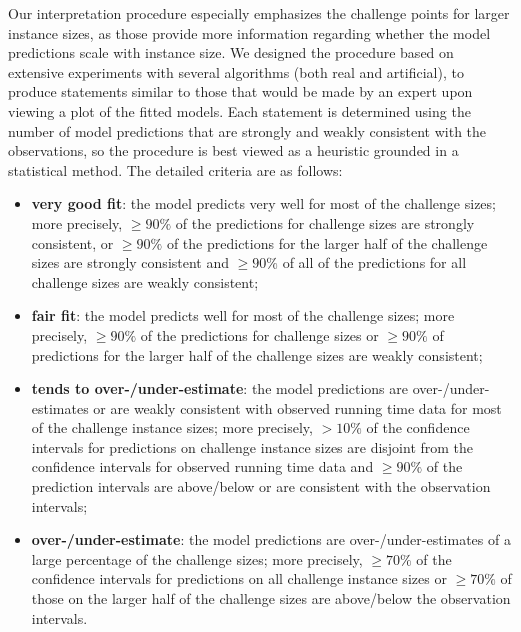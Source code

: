 \documentclass[aic]{iosart2x}
\begin{document}
Our interpretation procedure especially emphasizes the challenge points for larger instance sizes, as those provide more information regarding whether the model predictions scale with instance size. We designed the procedure based on extensive experiments with several algorithms (both real and artificial), to produce statements similar to those that would be made by an expert upon viewing a plot of the fitted models. Each statement is determined using the number of model predictions that are strongly and weakly consistent with the observations, so the procedure is best viewed as a heuristic grounded in a statistical method. The detailed criteria are as follows:
\begin{itemize}
\item \textbf{very good fit}: the model predicts very well for most of the challenge sizes; more precisely, $\geq 90\%$ of the predictions for challenge sizes are strongly consistent, or $\geq 90\%$ of the predictions for the larger half of the challenge sizes are strongly consistent and $ \geq 90\%$ of all of the predictions for all challenge sizes are weakly consistent;

\item \textbf{fair fit}: the model predicts well for most of the challenge sizes; more precisely, $\geq 90\%$ of the predictions for challenge sizes or $\geq 90\%$ of predictions for the larger half of the challenge sizes are weakly consistent;

\item \textbf{tends to over-/under-estimate}: the model predictions are over-/under-estimates or are weakly consistent with observed running time data for most of the challenge instance sizes; more precisely, $> 10\%$ of the confidence intervals for predictions on challenge instance sizes are disjoint from the confidence intervals for observed running time data and $\geq 90\%$ of the prediction intervals are above/below or are consistent with the observation intervals;

\item \textbf{over-/under-estimate}: the model predictions are over-/under-estimates of a large percentage of the challenge sizes; more precisely, $\geq 70\%$ of the confidence intervals for predictions on all challenge instance sizes or $\geq 70\%$ of those on the larger half of the challenge sizes are above/below the observation intervals.


\end{itemize}
\end{document}
